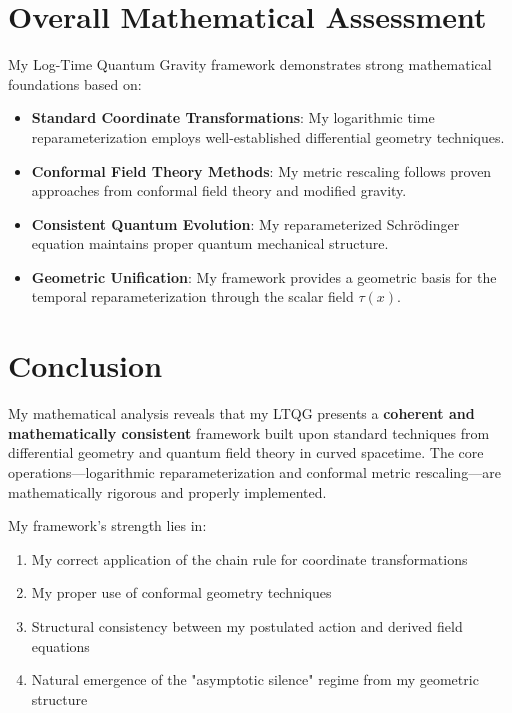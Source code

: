 \documentclass[11pt,a4paper]{article}
\begin{document}
\section{Overall Mathematical Assessment}

My Log-Time Quantum Gravity framework demonstrates strong mathematical foundations based on:

\begin{itemize}
\item \textbf{Standard Coordinate Transformations}: My logarithmic time reparameterization employs well-established differential geometry techniques.

\item \textbf{Conformal Field Theory Methods}: My metric rescaling follows proven approaches from conformal field theory and modified gravity.

\item \textbf{Consistent Quantum Evolution}: My reparameterized Schr\"{o}dinger equation maintains proper quantum mechanical structure.

\item \textbf{Geometric Unification}: My framework provides a geometric basis for the temporal reparameterization through the scalar field $\tau(x)$.
\end{itemize}

\section{Conclusion}

My mathematical analysis reveals that my LTQG presents a \textbf{coherent and mathematically consistent} framework built upon standard techniques from differential geometry and quantum field theory in curved spacetime. The core operations—logarithmic reparameterization and conformal metric rescaling—are mathematically rigorous and properly implemented.

My framework's strength lies in:
\begin{enumerate}
\item My correct application of the chain rule for coordinate transformations
\item My proper use of conformal geometry techniques
\item Structural consistency between my postulated action and derived field equations
\item Natural emergence of the "asymptotic silence" regime from my geometric structure
\end{enumerate}
\end{document}
